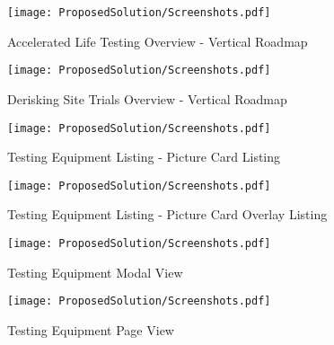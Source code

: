 \begin{figure}[H]
    \centering
    \begin{minipage}{0.45\textwidth}
        \centering
        \texttt{[image: ProposedSolution/Screenshots.pdf]} 
        \caption{Accelerated Life Testing Overview - Vertical Roadmap}
    \end{minipage}
    \centering
    \begin{minipage}{0.45\textwidth}
        \centering
        \texttt{[image: ProposedSolution/Screenshots.pdf]} 
        \caption{Derisking Site Trials Overview - Vertical Roadmap}
    \end{minipage}\hfill
    \begin{minipage}{0.45\textwidth}
        \centering
        \texttt{[image: ProposedSolution/Screenshots.pdf]} 
        \caption{Testing Equipment Listing - Picture Card Listing}
    \end{minipage}
    \centering
    \begin{minipage}{0.45\textwidth}
        \centering
        \texttt{[image: ProposedSolution/Screenshots.pdf]} 
        \caption{Testing Equipment Listing - Picture Card Overlay Listing}
    \end{minipage}\hfill
\end{figure}
\begin{figure}[H]
    \begin{minipage}{0.45\textwidth}
        \centering
        \texttt{[image: ProposedSolution/Screenshots.pdf]} 
        \caption{Testing Equipment Modal View}
    \end{minipage}
    \centering
    \begin{minipage}{0.45\textwidth}
        \centering
        \texttt{[image: ProposedSolution/Screenshots.pdf]} 
        \caption{Testing Equipment Page View}
    \end{minipage}\hfill
\end{figure}
